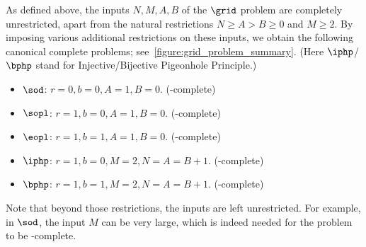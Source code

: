 \documentclass[10pt,a4paper]{article}
\theoremstyle{definition}
\theoremstyle{plain}
\theoremstyle{remark}
\begin{document}
As defined above, the inputs $N, M, A, B$ of the $\grid$ problem are completely unrestricted, apart from the natural restrictions $N \geq A > B \geq 0$ and $M \geq 2$. By imposing various additional restrictions on these inputs, we obtain the following canonical complete problems; see~\cref{figure:grid_problem_summary}. (Here $\iphp$/$\bphp$ stand for Injective/Bijective Pigeonhole Principle.)
\begin{itemize}
    \item $\sod$: $r=0, b=0, A=1, B=0$. (\PLS-complete)
    \item $\sopl$: $r=1, b=0, A=1, B=0$. (\SOPL-complete)
    \item $\eopl$: $r=1, b=1, A=1, B=0$. (\EOPL-complete)
    \item $\iphp$: $r=1, b=0, M=2, N=A=B+1$. (\PPADS-complete)
    \item $\bphp$: $r=1, b=1, M=2, N=A=B+1$. (\PPAD-complete)
\end{itemize}
Note that beyond those restrictions, the inputs are left unrestricted. For example, in $\sod$, the input $M$ can be very large, which is indeed needed for the problem to be \PLS-complete.
\end{document}
